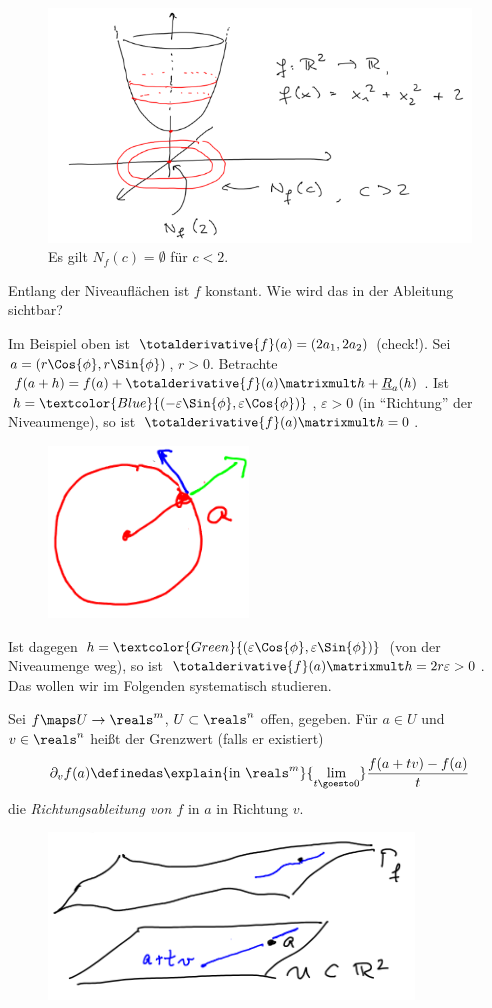 \begin{beispiel*}
    \begin{figure}[H]
        \centering
        \includegraphics[width=0.5\linewidth]{figures/niveau_menge_beispiel}
        \caption*{Es gilt \( N_f(c)=\emptyset \) für \( c<2 \).}
        \label{fig:niveau_menge_beispiel}
    \end{figure}
    Entlang der Niveauflächen ist \( f \) konstant. Wie wird das in der Ableitung sichtbar?

    Im Beispiel oben ist \( \totalderivative{f}(a)=(2a_1,2a_2) \) (check!). Sei \( a=(r\Cos{\phi}, r\Sin{\phi}) \), \( r>0 \). Betrachte \( f(a+h)=f(a)+\totalderivative{f}(a)\matrixmult h+\underline{R}_a(h) \). Ist \( h=\textcolor{Blue}{(-\varepsilon \Sin{\phi}, \varepsilon \Cos{\phi})} \), \( \varepsilon>0 \) (in \enquote{Richtung} der Niveaumenge), so ist \( \totalderivative{f}(a)\matrixmult h=0 \).
    \begin{figure}[H]
        \centering
        \includegraphics[width=0.2\linewidth]{figures/in_richtung_und_orthogonal_der_niveaumenge}
        \label{fig:in_richtung_und_orthogonal_der_niveaumenge}
    \end{figure}
    Ist dagegen \( h=\textcolor{Green}{(\varepsilon \Cos{\phi}, \varepsilon \Sin{\phi})} \) (von der Niveaumenge weg), so ist \( \totalderivative{f}(a)\matrixmult h=2r\varepsilon>0 \). Das wollen wir im Folgenden systematisch studieren.
\end{beispiel*}
\begin{definition*}
    Sei \( f\maps U\to \reals^m \), \( U\subset \reals^n \) offen, gegeben. Für \( a\in U \) und \( v\in \reals^n \) heißt der Grenzwert (falls er existiert)
    \begin{align*}
        \partial_v f(a)\definedas \explain{\text{in \( \reals^m \)}}{\lim_{t \goesto 0}}\frac{f(a+tv)-f(a)}{t}
    \end{align*}
    die \emph{Richtungsableitung von \( f \)} in \( a \) in Richtung \( v \).
    \begin{figure}[H]
        \centering
        \includegraphics[width=0.5\linewidth]{figures/richtungsableitung}
        \label{fig:richtungsableitung}
    \end{figure}
\end{definition*}
